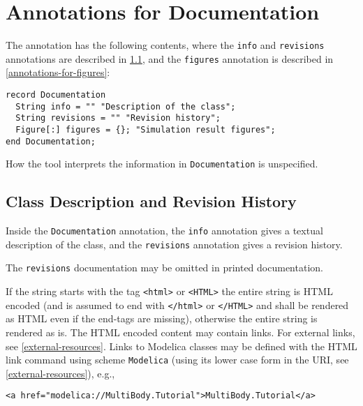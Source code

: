\section{Annotations for Documentation}\label{annotations-for-documentation}

The  annotation has the following contents, where the \lstinline!info! and \lstinline!revisions! annotations are described in \cref{annotation-info-revisions}, and the \lstinline!figures! annotation is described in \cref{annotations-for-figures}:
\begin{lstlisting}[language=modelica]
record Documentation
  String info = "" "Description of the class";
  String revisions = "" "Revision history";
  Figure[:] figures = {}; "Simulation result figures";
end Documentation;
\end{lstlisting}

How the tool interprets the information in \lstinline!Documentation! is unspecified.

\subsection{Class Description and Revision History}\label{annotation-info-revisions}

Inside the \lstinline!Documentation! annotation, the \lstinline!info! annotation gives a textual description of the class, and the \lstinline!revisions! annotation gives a revision history.

\begin{nonnormative}
The \lstinline!revisions! documentation may be omitted in printed documentation.
\end{nonnormative}

If the string starts with the tag \lstinline!<html>! or \lstinline!<HTML>! the entire string is HTML encoded (and is assumed to end with \lstinline!</html>! or \lstinline!</HTML>! and shall be rendered as HTML even if the end-tags are missing), otherwise the entire string is rendered as is.  The HTML encoded content may contain links.  For external links, see \cref{external-resources}.  Links to Modelica classes may be defined with the HTML link command using scheme \lstinline!Modelica! (using its lower case form in the URI, see \cref{external-resources}), e.g.,
\begin{lstlisting}[language=modelica]
<a href="modelica://MultiBody.Tutorial">MultiBody.Tutorial</a>
\end{lstlisting}

